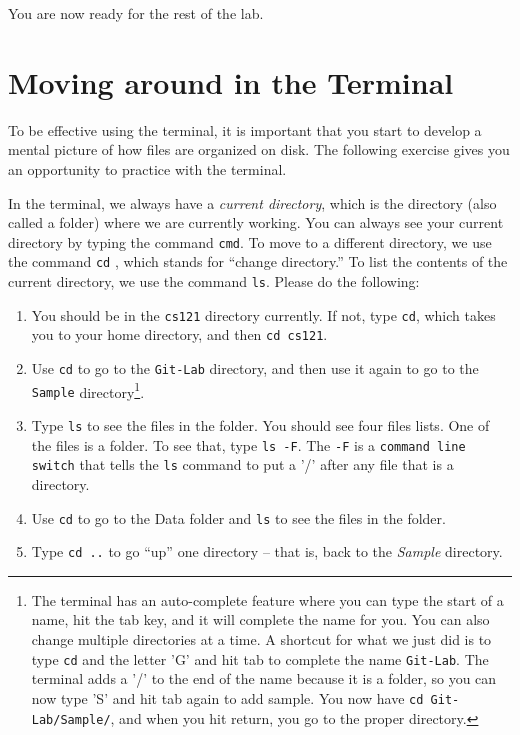 \documentclass[11pt]{article}
\begin{document}
You are now ready for the rest of the lab.

\section*{Moving around in the Terminal}

To be effective using the terminal, it is important that you start to develop a mental picture of how files are organized on disk.  The following exercise gives you an opportunity to practice with the terminal.

In the terminal, we always have a {\em current directory}, which is the directory (also called a folder) where we are currently working.  You can always see your current directory by typing the command {\tt cmd}.  To move to a different directory, we use the command {\tt cd} , which stands for ``change directory.''  To list the contents of the current directory, we use the command {\tt ls}.  Please do the following:

\begin{enumerate}
\item You should be in the {\tt cs121} directory currently.  If not, type {\tt cd}, which takes you to your home directory, and then {\tt cd cs121}.

\item Use {\tt cd} to go to the {\tt Git-Lab} directory, and then use it again to go to the {\tt Sample} directory\footnote{The terminal has an auto-complete feature where you can type the start of a name, hit the tab key, and it will complete the name for you.  You can also change multiple directories at a time.  A shortcut for what we just did is to type {\tt cd} and the letter 'G' and hit tab to complete the name {\tt Git-Lab}. The terminal adds a '/' to the end of the name because it is a folder, so you can now type 'S' and hit tab again to add sample.  You now have {\tt cd Git-Lab/Sample/}, and when you hit return, you go to the proper directory.}.

\item Type {\tt ls} to see the files in the folder.  You should see four files lists.  One of the files is a folder.  To see that, type {\tt ls -F}.  The {\tt -F} is a {\tt command line switch} that tells the {\tt ls} command to put a '/' after any file that is a directory.

\item Use {\tt cd} to go to the Data folder and {\tt ls} to see the files in the folder.

\item Type {\tt cd ..} to go ``up'' one directory -- that is, back to the {\em Sample} directory.

\end{enumerate}
\end{document}
